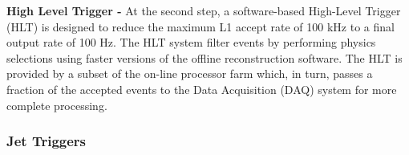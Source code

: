{\bf High Level Trigger -} At the second step, a software-based High-Level Trigger (HLT) is designed to reduce the maximum L1 accept rate of 100 kHz to a final output rate of 100 Hz. The HLT system filter events by performing physics selections using faster versions of the offline reconstruction software. The HLT is provided by a subset of the on-line processor farm which, in turn, passes a fraction of the accepted events to the Data Acquisition (DAQ) system for more complete processing.

\subsubsection{Jet Triggers}
\begin{comment}
\begin{figure}[!h]
\begin{center}
\vspace*{3mm} 
\hspace*{-5mm}
\texttt{[image: /home/anter/Desktop/Thesis/Figures/Jet\_trigger.png]}\\
\vspace*{4mm}
\caption[Muon]{Illustration of the available tower granularity for the L1 jet finding algorithm in the
central region, |η|<3 (left). The jet trigger uses a 3×3 calorimeter region sliding window technique which spans the full(η,φ)coverage of the calorimeter. The active tower patterns allowed for L1τjet candidates are shown on the right Work flow of the L1 trigger system \cite{Chatrchyan:2008aa}.}
\label{fig:Jettrigger}
\end{center}
\end{figure}
\end{comment}
